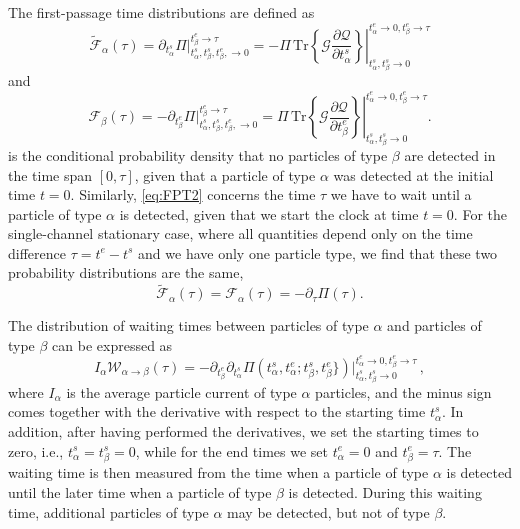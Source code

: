 \documentclass[aps,prl,amsmath,twocolumn,floatfix,superscriptaddress,longbibliography,footinbib]{revtex4-1}
\begin{document}
The first-passage time distributions are defined as 
\begin{equation}
	\tilde{\mathcal{F}}_{\alpha}(\tau) = \partial_{t^{s}_{\alpha}} \Pi\big|_{t^{s}_\alpha,t^s_\beta,t^e_\beta,\rightarrow 0}^{t^{e}_\beta\rightarrow \tau} = -\Pi\, \left. \mathrm{Tr}\left\{ \mathcal{G}\frac{\partial \mathcal{Q}}{\partial t^{s}_{\alpha}}\right\} \right|_{t^{s}_\alpha,t^s_\beta\rightarrow 0}^{t^e_\alpha\rightarrow 0, t^{e}_\beta\rightarrow \tau} 
	\label{eq:FPT1}
\end{equation}
and
\begin{equation}
	\mathcal{F}_{\beta}(\tau) =-\partial_{t^{e}_{\beta}}\Pi\big|_{t^{s}_\alpha,t^s_\beta,t^e_\beta,\rightarrow 0}^{t^{e}_\beta\rightarrow \tau}=\Pi\,  \left. \mathrm{Tr}\left\{\mathcal{G} \frac{\partial \mathcal{Q}}{\partial t^{e}_{\beta}}\right\} \right|_{t^{s}_\alpha,t^s_\beta\rightarrow 0}^{t^e_\alpha\rightarrow 0, t^{e}_\beta\rightarrow \tau} .
	\label{eq:FPT2}
\end{equation}
 is the conditional probability density that no particles of type $\beta$ are detected in the time span $[0,\tau]$, given that a particle of type $\alpha$ was detected at the initial time $t\!=\!0$. Similarly, \cref{eq:FPT2} concerns the time $\tau$ we have to wait until a particle of type $\alpha$ is detected, given that we start the clock at time $t\!=\!0$. 
For the single-channel stationary case, where all quantities depend only on the time difference $\tau= t^e-t^s$ and we have only one particle type, we find that these two probability distributions are the same, 
\[
\tilde{\mathcal{F}}_\alpha(\tau) = \mathcal{F}_\alpha(\tau) = -\partial_\tau \Pi(\tau) .
\]

The distribution of waiting times between particles of type $\alpha$ and particles of type $\beta$ can be expressed as\,\cite{Dasenbrook2015}
\begin{equation}
	I_{\alpha} \mathcal{W}_{\alpha \rightarrow \beta}(\tau)  = -\partial_{t^{e}_\beta} \partial_{t^{s}_\alpha}\Pi(t_{\alpha}^s,t_{\alpha}^e;t_{\beta}^s,t_\beta^e\})\big|_{t^{s}_\alpha,t^s_\beta \rightarrow 0}^{t^e_\alpha \rightarrow 0, t^{e}_\beta\rightarrow \tau} \,,
	\label{eq:WTD}
\end{equation}
where $I_\alpha$ is the average particle current of type $\alpha$ particles, and the minus sign comes together with the derivative with respect to the starting time $t_\alpha^s$. In addition, after having performed the derivatives, we set the starting times to zero, i.e., $t_\alpha^s\!=\!t_\beta^s=0$, while for the end times we set $t^{e}_\alpha\!=\! 0$ and $t^{e}_\beta\!=\!\tau$.  The waiting time is then measured from the time when a particle of type $\alpha$ is detected until the later time when a particle of type $\beta$ is detected. During this waiting time, additional particles of type $\alpha$ may be detected, but not of type $\beta$.
\end{document}
